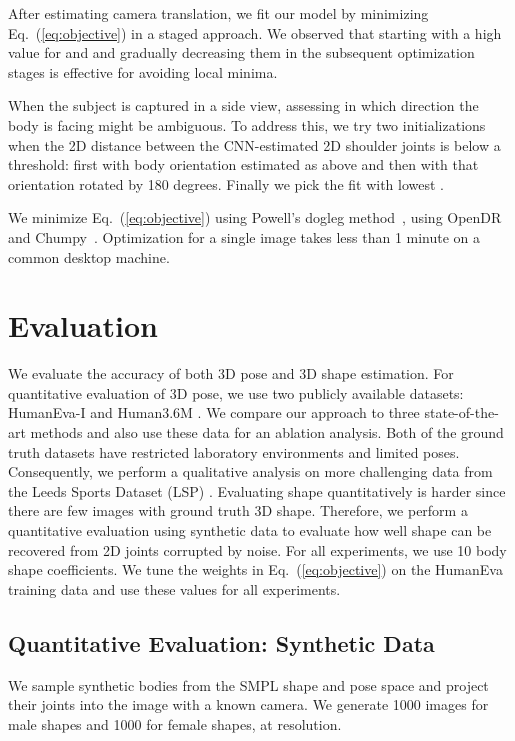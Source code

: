 \documentclass[runningheads]{llncs}
\begin{document}
After estimating camera translation, we fit our model by minimizing
Eq.~(\ref{eq:objective}) in a staged approach.
We observed that starting with a high value for  and  and gradually decreasing them in the subsequent optimization stages is effective for avoiding local minima.

When the subject is captured in a side view, assessing in which direction the body is facing might be ambiguous.
To address this, we try two initializations when the 2D distance between the CNN-estimated 2D shoulder joints is below a threshold: first with body orientation
estimated as above and then with that orientation rotated by 180
degrees. Finally we pick the fit with lowest .

We minimize Eq.~(\ref{eq:objective}) using Powell's dogleg method~\cite{nocedal}, using OpenDR and Chumpy~\cite{chumpy,loper14}. Optimization for a single image takes less than 1 minute on a common desktop machine.
 
\section{Evaluation}
\label{sec:experimental}
We evaluate the accuracy of both 3D pose and 3D shape estimation.
For quantitative evaluation of 3D pose, we use two
publicly available datasets: HumanEva-I \cite{HumanEva:2010} and Human3.6M \cite{Human36m:2014}.
We compare our approach to three state-of-the-art methods \cite{Akhter:2015,Ramakrishna:2012,Zhou:2015b} and also use these data for an ablation analysis.
Both of the ground truth datasets have restricted laboratory environments and limited poses.
Consequently, we perform a qualitative analysis on more challenging data from the Leeds Sports Dataset (LSP) \cite{LSP:2010}.
Evaluating shape quantitatively is harder since there are few images with ground truth 3D shape.
Therefore, we perform a quantitative evaluation using synthetic data to evaluate how well shape can be recovered from 2D joints corrupted by noise.
For all experiments, we use 10 body shape coefficients. 
We tune the  weights in Eq.~(\ref{eq:objective}) on the HumanEva training
data and use these values for all experiments.

\subsection{Quantitative Evaluation: Synthetic Data}
\label{subsec:data}


We sample synthetic bodies from the SMPL shape and pose space and project their joints into the image with a known camera. We generate 1000 images for male shapes and 1000 for female shapes, at  resolution.
\end{document}

